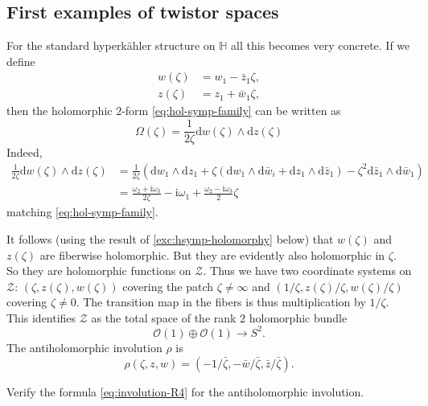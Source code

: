 \documentclass[12pt,letterpaper,reqno]{article}
\numberwithin{equation}{section}
\newcommand{\cZ}{\ensuremath{\mathcal Z}}
\newcommand{\cO}{\ensuremath{\mathcal O}}
\newcommand{\R}{\ensuremath{\mathbb R}}
\newcommand{\bbH}{\ensuremath{\mathbb H}}
\newcommand{\hk}{hyperk\"ahler\xspace}
\newcommand{\I}{{\mathrm i}}
\newcommand{\de}{\mathrm{d}}
\begin{document}
\subsection{First examples of twistor spaces}

\begin{example}[Twistor space of $\R^4$] \label{exa:R4-twistor-space}
For the standard \hk structure on $\bbH$ all this becomes very 
concrete. 
If we define
\begin{align}
  w(\zeta) &= w_1 - \bar{z}_1 \zeta, \\
  z(\zeta) &= z_1 + \bar{w}_1 \zeta,
\end{align}
then the holomorphic $2$-form \eqref{eq:hol-symp-family}
can be written as
\begin{equation}
  \Omega(\zeta) = \frac{1}{2\zeta} \de w(\zeta) \wedge \de z(\zeta)
\end{equation}
Indeed,
\begin{align}
  \frac{1}{2\zeta} \de w(\zeta) \wedge \de z(\zeta) &= \frac{1}{2\zeta} (\de w_1 \wedge \de z_1 + \zeta (\de w_1 \wedge \de \bar{w}_i + \de z_1 \wedge \de \bar{z}_1) - \zeta^2 \de \bar{z}_1 \wedge \de \bar{w}_1) \\
  &= \frac{\omega_2 + \I \omega_3}{2\zeta} - \I\omega_1 + \frac{\omega_2 - \I \omega_3}{2} \zeta
\end{align}
matching \eqref{eq:hol-symp-family}.

It follows (using the result of \autoref{exc:hsymp-holomorphy} below)
that $w(\zeta)$ and $z(\zeta)$ are fiberwise holomorphic.
But they are evidently also holomorphic in $\zeta$. So they are 
holomorphic functions on $\cZ$.
Thus we have two coordinate systems on $\cZ$:
$(\zeta, z(\zeta), w(\zeta))$
covering the patch $\zeta \neq \infty$ and $(1/\zeta, z(\zeta)/\zeta, w(\zeta)/\zeta)$ covering $\zeta \neq 0$. The transition map 
in the fibers is thus multiplication by $1/\zeta$.
This identifies
$\cZ$ as the total space of the rank $2$ holomorphic bundle
\begin{equation}
  \cO(1) \oplus \cO(1) \to S^2.
\end{equation}
The antiholomorphic involution $\rho$ is
\begin{equation} \label{eq:involution-R4}
  \rho(\zeta, z, w) = (-1/\bar\zeta, -\bar w / \bar\zeta, \bar z / \bar \zeta).
\end{equation}
\end{example}

\begin{exercise}
Verify the formula \eqref{eq:involution-R4} for the antiholomorphic
involution.
\end{exercise}
\end{document}
